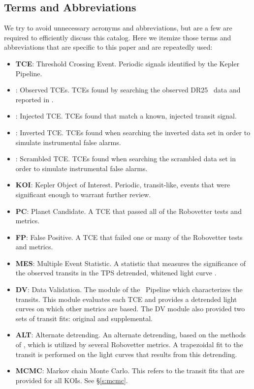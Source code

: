 \subsection{Terms and Abbreviations}
\label{abbrev}
We try to avoid unnecessary acronyms and abbreviations, but are a few are required to efficiently discuss this catalog.  Here we itemize those terms and abbreviations that are specific to this paper and are repeatedly used:

\begin{itemize}
\item[] \textbf{TCE}: Threshold Crossing Event. Periodic signals identified by the Kepler Pipeline.
\item[] \textbf{\opstce}: Observed TCEs. TCEs found by searching the observed DR25 \Kepler\ data and reported in \citet{Twicken2016}.
\item[] \textbf{\injtce}: Injected TCE. TCEs found that match a known, injected transit signal.
\item[] \textbf{\invtce}: Inverted TCE. TCEs found when searching the inverted data set in order to simulate instrumental false alarms.
\item[] \textbf{\scrtce}: Scrambled TCE. TCEs found when searching the scrambled data set in order to simulate instrumental false alarms.
\item[] \textbf{KOI}: Kepler Object of Interest. Periodic, transit-like, events that were significant enough to warrant further review. 
\item[] \textbf{PC}: Planet Candidate. A TCE that passed all of the Robovetter tests and metrics.
\item[] \textbf{FP}: False Positive. A TCE that failed one or many of the Robovetter tests and metrics.
\item[] \textbf{MES}: Multiple Event Statistic. A statistic that measures the significance of the observed transits in the TPS detrended, whitened light curve \citep{Jenkins2002a}.
\item[] \textbf{DV}: Data Validation. The module of the \Kepler\ Pipeline which characterizes the transits. This module evaluates each TCE and provides a detrended light curves on which other metrics are based. The DV module also provided two sets of transit fits: original and supplemental.
\item[] \textbf{ALT}: Alternate detrending. An alternate detrending, based on the methods of \citet{Garcia2010}, which is utilized by several Robovetter metrics. A trapezoidal fit to the transit is performed on the light curves that results from this detrending.
\item[] \textbf{MCMC}: Markov chain Monte Carlo. This refers to the transit fits that are provided for all KOIs. See \S\ref{s:mcmc}.

\end{itemize}
